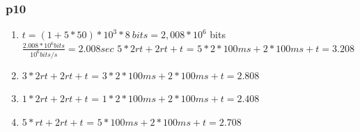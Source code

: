 \documentclass[a4paper,10pt,titlepage]{report}
\begin{document}
\subsubsection{p10}
\begin{enumerate}[label=(\alph*)]
\item $t = (1+5*50)*10^3*8 \ bits   =  2,008 * 10^6$ bits \\
		$ \frac{2.008*10^6 bits}{10^6 bits/s} = 2.008 sec $
		$5*2rt + 2rt + t $ = $ 5*2*100ms + 2*100ms + t = 3.208 $
		
\item $3*2rt + 2rt + t $ = $ 3*2*100ms + 2*100ms + t = 2.808 $

\item $1*2rt + 2rt + t $ = $ 1*2*100ms + 2*100ms + t = 2.408 $

\item $5*rt + 2rt + t $ = $ 5*100ms + 2*100ms + t = 2.708 $

\end{enumerate}
\end{document}
